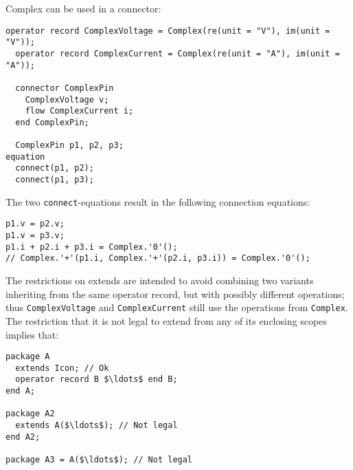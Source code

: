 \begin{example}
Complex can be used in a connector:
\begin{lstlisting}[language=modelica]
  operator record ComplexVoltage = Complex(re(unit = "V"), im(unit = "V"));
  operator record ComplexCurrent = Complex(re(unit = "A"), im(unit = "A"));

  connector ComplexPin
    ComplexVoltage v;
    flow ComplexCurrent i;
  end ComplexPin;

  ComplexPin p1, p2, p3;
equation
  connect(p1, p2);
  connect(p1, p3);
\end{lstlisting}
The two \lstinline!connect!-equations result in the following connection equations:
\begin{lstlisting}[language=modelica]
p1.v = p2.v;
p1.v = p3.v;
p1.i + p2.i + p3.i = Complex.'0'();
// Complex.'+'(p1.i, Complex.'+'(p2.i, p3.i)) = Complex.'0'();
\end{lstlisting}
The restrictions on extends are intended to avoid combining two variants inheriting from the same operator record, but with possibly different operations; thus \lstinline!ComplexVoltage! and \lstinline!ComplexCurrent! still use the operations from \lstinline!Complex!.
The restriction that it is not legal to extend from any of its enclosing scopes implies that:
\begin{lstlisting}[language=modelica]
package A
  extends Icon; // Ok
  operator record B $\ldots$ end B;
end A;

package A2
  extends A($\ldots$); // Not legal
end A2;

package A3 = A($\ldots$); // Not legal
\end{lstlisting}
\end{example}
